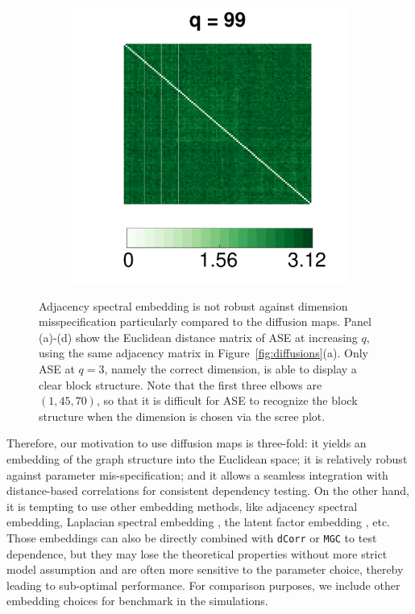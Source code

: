 \documentclass[11pt]{article}
\theoremstyle{definition}
\begin{document}
\begin{figure}[!ht]
\begin{subfigure}[b]{0.23\textwidth}
	\caption{}
	\label{fig:e10}
	\end{subfigure}
	\begin{subfigure}[b]{0.23\textwidth}
	\includegraphics[width=\textwidth]{../Figure/E99.pdf}
	\caption{}
	\label{fig:e99}
	\end{subfigure}
	\caption{Adjacency spectral embedding is not robust against dimension misspecification particularly compared to the diffusion maps. Panel (a)-(d) show the Euclidean distance matrix of ASE at increasing $q$, using the same adjacency matrix in Figure~\ref{fig:diffusions}(a). Only ASE at $q=3$, namely the correct dimension, is able to display a clear block structure. Note that the first three elbows are $(1,45,70)$, so that it is difficult for ASE to recognize the block structure when the dimension is chosen via the scree plot.}
\label{fig:embedding}
\end{figure}

Therefore, our motivation to use diffusion maps is three-fold: it yields an embedding of the graph structure into the Euclidean space; it is relatively robust against parameter mis-specification; and it allows a seamless integration with distance-based correlations for consistent dependency testing. On the other hand, it is tempting to use other embedding methods, like adjacency spectral embedding, Laplacian spectral embedding \cite{rohe2011spectral}, the latent factor embedding \cite{fosdick2015testing}, etc. Those embeddings can also be directly combined with \texttt{dCorr} or \texttt{MGC} to test dependence, but they may lose the theoretical properties without more strict model assumption and are often more sensitive to the parameter choice, thereby leading to sub-optimal performance. For comparison purposes, we include other embedding choices for benchmark in the simulations.
\end{document}
